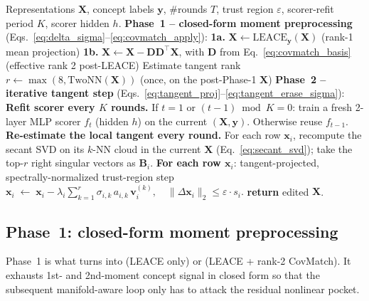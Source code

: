 \begin{algorithm}[t]
\caption{\TanGCEpp{}. Phase~1: LEACE + rank-2 covariance-asymmetry projection. Phase~2: iterative tangent-constrained step. Dropping line 1b yields \TanGCEp{}; dropping Phase 1 entirely yields \TanGCE{}.}
\label{alg:tangce}
\begin{algorithmic}[1]
\REQUIRE Representations $\mathbf{X}$, concept labels $\mathbf{y}$, $\#$rounds $T$, trust region $\varepsilon$, scorer-refit period $K$, scorer hidden $h$.
\STATE \textbf{Phase~1 -- closed-form moment preprocessing} (Eqs.~\ref{eq:delta_sigma}--\ref{eq:covmatch_apply}):
\STATE \hspace{1em} \textbf{1a.} $\mathbf{X} \leftarrow \mathrm{LEACE}_{\mathbf{y}}(\mathbf{X})$ \hfill (rank-1 mean projection)
\STATE \hspace{1em} \textbf{1b.} $\mathbf{X} \leftarrow \mathbf{X} - \mathbf{D}\mathbf{D}^\top \mathbf{X}$, with $\mathbf{D}$ from Eq.~\ref{eq:covmatch_basis} \hfill (effective rank 2 post-LEACE)
\STATE Estimate tangent rank $r \leftarrow \max(8, \mathrm{TwoNN}(\mathbf{X}))$ \hfill (once, on the post-Phase-1 $\mathbf{X}$)
\STATE \textbf{Phase~2 -- iterative tangent step} (Eqs.~\ref{eq:tangent_proj}--\ref{eq:tangent_erase_sigma}):
 \STATE \textbf{Refit scorer every $K$ rounds.} If $t = 1$ or $(t - 1) \bmod K = 0$: train a fresh 2-layer MLP scorer $f_t$ (hidden $h$) on the current $(\mathbf{X}, \mathbf{y})$. Otherwise reuse $f_{t-1}$.
 \STATE \textbf{Re-estimate the local tangent every round.} For each row $\mathbf{x}_i$, recompute the secant SVD on its $k$-NN cloud in the current $\mathbf{X}$ (Eq.~\ref{eq:secant_svd}); take the top-$r$ right singular vectors as $\mathbf{B}_i$.
 \STATE \textbf{For each row $\mathbf{x}_i$}: tangent-projected, spectrally-normalized trust-region step
 \STATE \hspace{2em} $\displaystyle \mathbf{x}_i \;\leftarrow\; \mathbf{x}_i - \lambda_i \sum_{k=1}^{r} \sigma_{i,k} \, a_{i,k} \, \mathbf{v}_i^{(k)}, \quad \|\Delta\mathbf{x}_i\|_2 \leq \varepsilon \cdot s_i.$
\ENDFOR
\STATE \textbf{return} edited $\mathbf{X}$.
\end{algorithmic}
\end{algorithm}

\subsection{Phase~1: closed-form moment preprocessing}
\label{sec:moment_preproc}

Phase~1 is what turns \TanGCE{} into \TanGCEp{} (LEACE only) or \TanGCEpp{} (LEACE + rank-2 CovMatch). It exhausts 1st- and 2nd-moment concept signal in closed form so that the subsequent manifold-aware loop only has to attack the residual nonlinear pocket.

